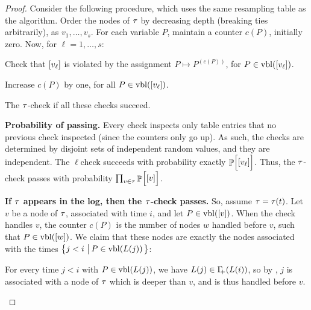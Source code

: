 \begin{proof}
    Consider the following  procedure, which
    uses the same resampling table as the algorithm. Order the nodes
    of $\tau$ by decreasing depth (breaking ties arbitrarily), as
    $v_1, \ldots, v_s$. For each variable $P$, maintain a counter
    $c(P)$, initially zero. Now, for $\ell = 1, \ldots, s$:
    \begin{compactitem}
        \item Check that $\left[ v_\ell \right]$ is violated by the assignment
        $P \mapsto P^{(c(P))}$, for $P \in \vblX{\LabelX{v_\ell}}$.

        \item Increase $c(P)$ by one, for all
        $P \in \vblX{\LabelX{v_\ell}}$.
    \end{compactitem}
    The $\tau$-check  if all these checks succeed.

    \bigskip

    \noindent\textbf{Probability of passing.} Every check inspects
    only table entries that no previous check inspected (since the
    counters only go up). As such, the checks are determined by
    disjoint sets of independent random values, and they are
    independent. The $\ell$\th check succeeds with probability
    exactly $\Prob{\Bigl.\LabelX{v_\ell}}$. Thus, the $\tau$-check passes
    with probability $\prod_{v \in \WTree} \Prob{\Bigl.\LabelX{v}}$.

    \bigskip

    \noindent\textbf{If $\tau$ appears in the log, then the
       $\tau$-check passes.} So, assume $\WTree = \WTreeX{t}$. Let
    $v$ be a node of $\tau$, associated with time $i$, and let
    $P \in \vblX{\LabelX{v}}$. When the check handles $v$, the
    counter $c(P)$ is the number of nodes $w$ handled before $v$, such
    that $P \in \vblX{\LabelX{w}}$. We claim that these nodes are
    exactly the nodes associated with the times
    $\brc{j < i \sep{ P \in \vblX{\ELogX{j}}}}$:
    \begin{compactitem}
        \smallskip%
        \item For every time $j < i$ with
        $P \in \vblX{\ELogX{j}}$, we have
        $\ELogX{j} \in \NbrCX{\ELogX{i}}$, so by ,
        $j$ is associated with a node of $\tau$ which is deeper than
        $v$, and is thus handled before $v$.


\end{compactitem}
\end{proof}
